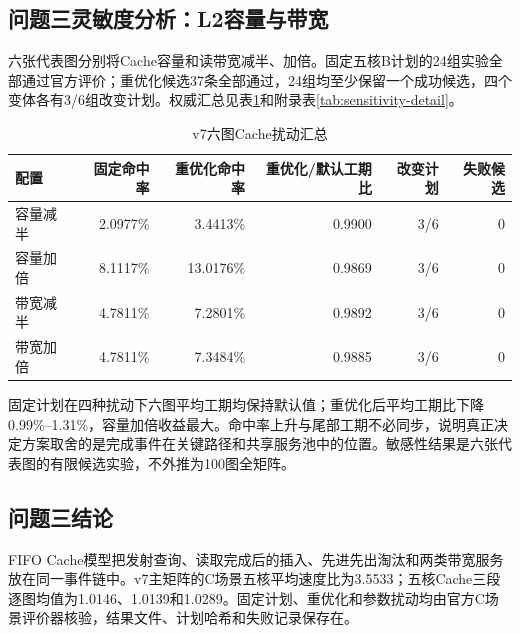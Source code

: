 \subsection{问题三灵敏度分析：L2容量与带宽}
六张代表图分别将Cache容量和读带宽减半、加倍。固定五核B计划的24组实验全部通过官方评价；重优化候选37条全部通过，24组均至少保留一个成功候选，四个变体各有3/6组改变计划。权威汇总见表\ref{tab:cache-sensitivity}和附录表\ref{tab:sensitivity-detail}。
\begin{table}[H]\centering\small\caption{v7六图Cache扰动汇总}\label{tab:cache-sensitivity}
\begin{tabular}{lrrrrr}\toprule
配置 & 固定命中率 & 重优化命中率 & 重优化/默认工期比 & 改变计划 & 失败候选\\\midrule
容量减半 & 2.0977\% & 3.4413\% & 0.9900 & 3/6 & 0\\
容量加倍 & 8.1117\% & 13.0176\% & 0.9869 & 3/6 & 0\\
带宽减半 & 4.7811\% & 7.2801\% & 0.9892 & 3/6 & 0\\
带宽加倍 & 4.7811\% & 7.3484\% & 0.9885 & 3/6 & 0\\\bottomrule
\end{tabular}
\end{table}

固定计划在四种扰动下六图平均工期均保持默认值；重优化后平均工期比下降0.99\%--1.31\%，容量加倍收益最大。命中率上升与尾部工期不必同步，说明真正决定方案取舍的是完成事件在关键路径和共享服务池中的位置。敏感性结果是六张代表图的有限候选实验，不外推为100图全矩阵。

\subsection{问题三结论}
FIFO Cache模型把发射查询、读取完成后的插入、先进先出淘汰和两类带宽服务放在同一事件链中。v7主矩阵的C场景五核平均速度比为3.5533；五核Cache三段逐图均值为1.0146、1.0139和1.0289。固定计划、重优化和参数扰动均由官方C场景评价器核验，结果文件、计划哈希和失败记录保存在。
